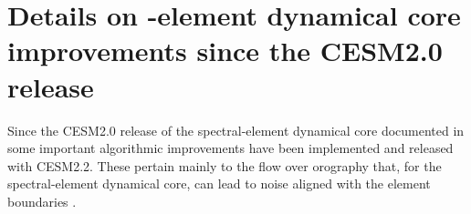 \documentclass[draft]{agujournal2019}
\begin{document}
%
%



%
%
%
%
\appendix
\section{Details on {\color{blue}{spectral}}-element dynamical core improvements since the CESM2.0 release}\label{sec:a1}
Since the CESM2.0 release of the spectral-element dynamical core documented in  some important algorithmic improvements have been implemented and released with CESM2.2. These pertain mainly to the flow over orography that, for the spectral-element dynamical core, can lead to noise aligned with the element boundaries \cite{HL2018MWR}.
\end{document}
